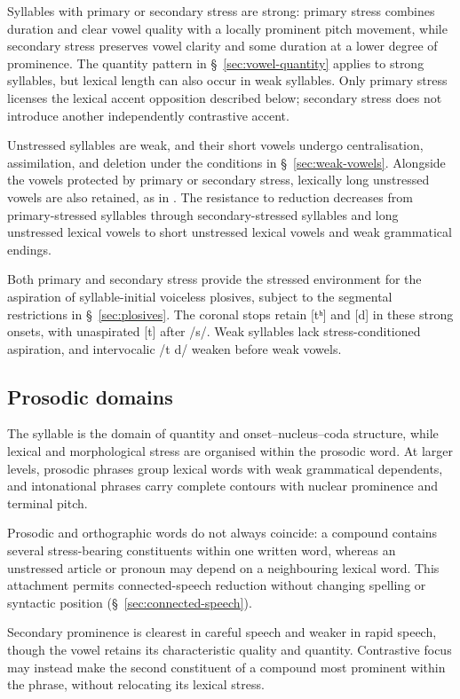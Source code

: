 Syllables with primary or secondary stress are strong: primary stress combines duration and clear vowel quality with a locally prominent pitch movement, while secondary stress preserves vowel clarity and some duration at a lower degree of prominence. The quantity pattern in \S~\ref{sec:vowel-quantity} applies to strong syllables, but lexical length can also occur in weak syllables. Only primary stress licenses the lexical accent opposition described below; secondary stress does not introduce another independently contrastive accent.

Unstressed syllables are weak, and their short vowels undergo centralisation, assimilation, and deletion under the conditions in \S~\ref{sec:weak-vowels}. Alongside the vowels protected by primary or secondary stress, lexically long unstressed vowels are also retained, as in . The resistance to reduction decreases from primary-stressed syllables through secondary-stressed syllables and long unstressed lexical vowels to short unstressed lexical vowels and weak grammatical endings.

Both primary and secondary stress provide the stressed environment for the aspiration of syllable-initial voiceless plosives, subject to the segmental restrictions in \S~\ref{sec:plosives}. The coronal stops retain [tʰ] and [d] in these strong onsets, with unaspirated [t] after /s/. Weak syllables lack stress-conditioned aspiration, and intervocalic /t d/ weaken before weak vowels.


\subsection{Prosodic domains}

The syllable is the domain of quantity and onset--nucleus--coda structure, while lexical and morphological stress are organised within the prosodic word. At larger levels, prosodic phrases group lexical words with weak grammatical dependents, and intonational phrases carry complete contours with nuclear prominence and terminal pitch.

Prosodic and orthographic words do not always coincide: a compound contains several stress-bearing constituents within one written word, whereas an unstressed article or pronoun may depend on a neighbouring lexical word. This attachment permits connected-speech reduction without changing spelling or syntactic position (\S~\ref{sec:connected-speech}).

Secondary prominence is clearest in careful speech and weaker in rapid speech, though the vowel retains its characteristic quality and quantity. Contrastive focus may instead make the second constituent of a compound most prominent within the phrase, without relocating its lexical stress.

